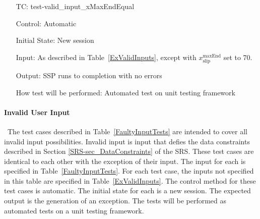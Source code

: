 \documentclass[12pt, titlepage]{article}
\newcounter{testnum} %
\newcommand{\progname}{SSP}
\begin{document}
\begin{enumerate}[label=TC\arabic*:,ref={\arabic*}]
Input: As described in Table~\ref{ExValidInputs}, except with 
${x_\text{slip}^\text{minStart}}$ set to 0.

Output: \progname{} runs to completion with no errors

How test will be performed: Automated test on unit testing framework

\item [TC\refstepcounter{testnum}\thetestnum: \label{TC_ValidInXMaxEndEqual}] 
test-valid\_input\_xMaxEndEqual

Control: Automatic

Initial State: New session

Input: As described in Table~\ref{ExValidInputs}, except with 
${x_\text{slip}^\text{maxEnd}}$ set to 70.

Output: \progname{} runs to completion with no errors

How test will be performed: Automated test on unit testing framework

\end{enumerate}

\paragraph{Invalid User Input}

~\newline \noindent The test cases described in Table~\ref{FaultyInputTests} 
are intended to cover all invalid input possibilities. Invalid input is input 
that defies the data constraints described in Section 
\ref{SRS-sec_DataConstraints} of the SRS. These test cases are identical to 
each other with the exception of their input. The input for each is specified 
in Table~\ref{FaultyInputTests}. For each test case, the inputs not specified 
in this table are specified in Table~\ref{ExValidInputs}. The control method 
for these test cases is automatic. The initial state for each is a new session. 
The expected output is the generation of an exception. The tests will be 
performed as automated tests on a unit testing framework.
\end{document}

